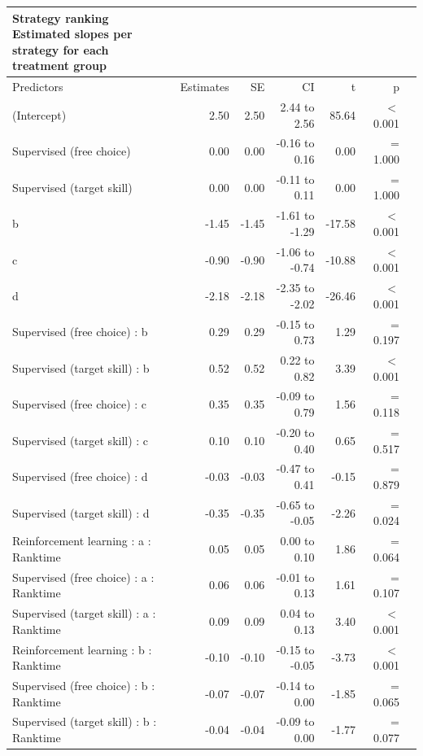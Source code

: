 \documentclass[pdflatex,sn-mathphys-num]{sn-jnl}%
\theoremstyle{thmstyleone}%
\theoremstyle{thmstyletwo}%
\theoremstyle{thmstylethree}%
\begin{document}
\begin{appendices}
\clearpage
\setlength{\LTpost}{0mm}
\begin{longtable}{lrrrrrl}\label{suptable_strategyranking_strategiesslope}
\caption*{
{\large Strategy ranking} \\ 
{\small Estimated slopes per strategy for each treatment group}
} \\ 
\toprule
Predictors & Estimates & SE & CI & t & p \\ 
\midrule\addlinespace[2.5pt]
(Intercept) & 2.50 & 2.50 & 2.44 to 2.56 & 85.64 &  $<$  0.001 \\ 
Supervised (free choice) & 0.00 & 0.00 & -0.16 to 0.16 & 0.00 &  =  1.000 \\ 
Supervised (target skill)  & 0.00 & 0.00 & -0.11 to 0.11 & 0.00 &  =  1.000 \\ 
b & -1.45 & -1.45 & -1.61 to -1.29 & -17.58 &  $<$  0.001 \\ 
c  & -0.90 & -0.90 & -1.06 to -0.74 & -10.88 &  $<$  0.001 \\ 
d & -2.18 & -2.18 & -2.35 to -2.02 & -26.46 &  $<$  0.001 \\ 
Supervised (free choice) : b & 0.29 & 0.29 & -0.15 to 0.73 & 1.29 &  =  0.197 \\ 
Supervised (target skill) : b & 0.52 & 0.52 & 0.22 to 0.82 & 3.39 &  $<$  0.001 \\ 
Supervised (free choice) : c & 0.35 & 0.35 & -0.09 to 0.79 & 1.56 &  =  0.118 \\ 
Supervised (target skill)  : c & 0.10 & 0.10 & -0.20 to 0.40 & 0.65 &  =  0.517 \\ 
Supervised (free choice) : d & -0.03 & -0.03 & -0.47 to 0.41 & -0.15 &  =  0.879 \\ 
Supervised (target skill)  : d & -0.35 & -0.35 & -0.65 to -0.05 & -2.26 &  =  0.024 \\ 
Reinforcement learning : a : Ranktime & 0.05 & 0.05 & 0.00 to 0.10 & 1.86 &  =  0.064 \\ 
Supervised (free choice) : a : Ranktime & 0.06 & 0.06 & -0.01 to 0.13 & 1.61 &  =  0.107 \\ 
Supervised (target skill) : a : Ranktime & 0.09 & 0.09 & 0.04 to 0.13 & 3.40 &  $<$  0.001 \\ 
Reinforcement learning : b : Ranktime & -0.10 & -0.10 & -0.15 to -0.05 & -3.73 &  $<$  0.001 \\ 
Supervised (free choice) : b : Ranktime & -0.07 & -0.07 & -0.14 to 0.00 & -1.85 &  =  0.065 \\ 
Supervised (target skill) : b : Ranktime & -0.04 & -0.04 & -0.09 to 0.00 & -1.77 &  =  0.077 \\ 

\end{longtable}
\end{appendices}
\end{document}
